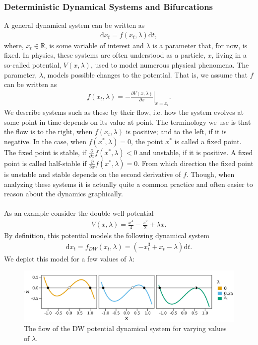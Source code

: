 \subsubsection{Deterministic Dynamical Systems and Bifurcations}
A general dynamical system can be written as
\begin{align}
    \mathrm{d}x_t = f(x_t, \lambda)\mathrm{d}t, \label{eq:generalDynamicalSystem}
\end{align}
where, $x_t\in\mathbb{R}$, is some variable of interest and $\lambda$ is a parameter that, for now, is fixed. In physics, these systems are often understood as a particle, $x$, living in a so-called potential, $V(x,\lambda)$, used to model numerous physical phenomena. The parameter, $\lambda$, models possible changes to the potential. That is, we assume that $f$ can be written as
\begin{align}
     f(x_t, \lambda) = \left.-\frac{\partial V(x,\lambda)}{\partial x}\right|_{x=x_t}.
\end{align}
We describe systems such as these by their flow, i.e. how the system evolves at some point in time depends on its value at point. The terminology we use is that the flow is to the right, when $f(x_t, \lambda)$ is positive; and to the left, if it is negative. In the case, when $f(x^*, \lambda) = 0$, the point $x^*$ is called a fixed point. The fixed point is stable, if $\frac{\partial}{\partial x}f(x^*, \lambda) < 0$ and unstable, if it is positive. A fixed point is called half-stable if $\frac{\partial}{\partial x}f(x^*, \lambda) = 0$. From which direction the fixed point is unstable and stable depends on the second derivative of $f$. Though, when analyzing these systems it is actually quite a common practice and often easier to reason about the dynamics graphically.\\\\
As an example consider the double-well potential
\begin{align}
    V(x,\lambda) = \frac{x^4}{4} - \frac{x^2}{2} + \lambda x\label{eq:doubleWellPotential}.
\end{align}
By definition, this potential models the following dynamical system
\begin{align}
    \mathrm{d}x_t = f_{DW}(x_t, \lambda) = \left(-x_t^3 + x_t - \lambda \right) \mathrm{d}t \label{eq:originalDW}.
\end{align}
We depict this model for a few values of $\lambda$:
\begin{figure}[h]
    \begin{center}
        \includegraphics[scale = .14]{figures/double_well_plot.jpeg}
        \caption{The flow of the DW potential dynamical system for varying values of $\lambda$.}
        \label{figure:DW_dynamic_plot}
    \end{center}
\end{figure}\\
